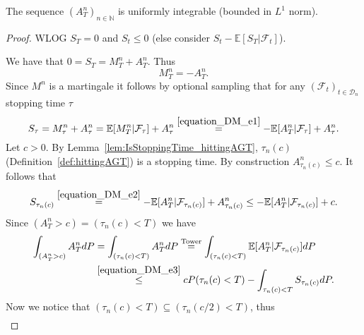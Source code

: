 \begin{lemma}\label{lem:A_uniform_integrable}
  The sequence $(A^n_T)_{n\in\mathbb{N}}$ is uniformly integrable (bounded in $L^1$ norm).
\end{lemma}

\begin{proof}
  WLOG $S_T=0$ and $S_t\leq 0$ (else consider $S_t-\mathbb{E}\left[S_T\vert\mathcal{F}_{t}\right]$).

  We have that $0=S_T=M^n_T+A^n_T$. Thus
  \begin{equation}\label{equation_DM_e1}
  M^n_T=-A^n_T.
  \end{equation}
  Since $M^n$ is a martingale it follows by optional sampling that for any $(\mathcal{F}_t)_{t\in\mathcal{D}_n}$ stopping time $\tau$
  \begin{equation}\label{equation_DM_e2}
  S_\tau=M^n_\tau+A^n_\tau = \mathbb{E}[M^n_T\vert\mathcal{F}_\tau]+A^n_\tau\stackrel{\eqref{equation_DM_e1}}{=} -\mathbb{E}[A^n_T\vert\mathcal{F}_\tau]+A^n_\tau.
  \end{equation}
  Let $c>0$. By Lemma~\ref{lem:IsStoppingTime_hittingAGT}, $\tau_n(c)$ (Definition~\ref{def:hittingAGT}) is a stopping time.
  By construction $A^n_{\tau_n(c)}\leq c$. It follows that
  \begin{equation}\label{equation_DM_e3}
  S_{\tau_n(c)}\stackrel{\eqref{equation_DM_e2}}{=}-\mathbb{E}[A^n_T\vert\mathcal{F}_{\tau_n(c)}]+A^n_{\tau_n(c)}\leq -\mathbb{E}[A^n_T\vert\mathcal{F}_{\tau_n(c)}]+c.
  \end{equation}
  Since $(A^n_T>c)=(\tau_n(c)<T)$ we have
  \begin{align}\nonumber
  \int_{(A^n_T>c)}A^n_TdP&=\int_{(\tau_n(c)<T)}A^n_TdP\stackrel{\mathrm{Tower}}{=}\int_{(\tau_n(c)<T)}\mathbb{E}[A^n_T\vert\mathcal{F}_{\tau_n(c)}]dP\\
  &\stackrel{\eqref{equation_DM_e3}}{\leq} cP(\tau_n(c)<T)-\int_{\tau_n(c)<T}S_{\tau_n(c)}dP.\label{equation_DM_e4}
  \end{align}
  Now we notice that $(\tau_n(c)<T)\subseteq (\tau_n(c/2)<T)$, thus
  \begin{align}\nonumber

\end{align}
\end{proof}
